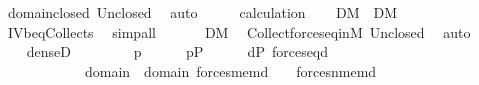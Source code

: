 \begin{isabellebody}
\ domain{\isacharunderscore}{\kern0pt}closed\ Un{\isacharunderscore}{\kern0pt}closed\ \isamarkupfalse%
\ auto\isanewline
\ \ \isamarkupfalse%
\ \isamarkupfalse%
\ calculation\isanewline
\ \ \isamarkupfalse%
\ {\isachardoublequoteopen}{\isacharquery}{\kern0pt}D{}{\isasymin}M{\isachardoublequoteclose}\ \ {\isachardoublequoteopen}{\isacharquery}{\kern0pt}D{}{\isasymin}M{\isachardoublequoteclose}\ \isamarkupfalse%
\ IV{}{}{}b{\isacharunderscore}{\kern0pt}eq{\isacharunderscore}{\kern0pt}Collects\ \isamarkupfalse%
\ simp{\isacharunderscore}{\kern0pt}all\isanewline
\ \ \isamarkupfalse%
\isanewline
\ \ \isamarkupfalse%
\ {\isachardoublequoteopen}{\isacharquery}{\kern0pt}D{\isasymin}M{\isachardoublequoteclose}\ \isamarkupfalse%
\ Collect{\isacharunderscore}{\kern0pt}forces{\isacharunderscore}{\kern0pt}eq{\isacharunderscore}{\kern0pt}in{\isacharunderscore}{\kern0pt}M\ Un{\isacharunderscore}{\kern0pt}closed\ \isamarkupfalse%
\ auto\isanewline
\ \ \isamarkupfalse%
\isanewline
\ \ \isamarkupfalse%
\ {\isachardoublequoteopen}dense{\isacharparenleft}{\kern0pt}{\isacharquery}{\kern0pt}D{\isacharparenright}{\kern0pt}{\isachardoublequoteclose}\isanewline
\ \ \isamarkupfalse%
\isanewline
\ \ \ \ \isamarkupfalse%
\ p\isanewline
\ \ \ \ \isamarkupfalse%
\ {\isachardoublequoteopen}p{\isasymin}P{\isachardoublequoteclose}\isanewline
\ \ \ \ \isamarkupfalse%
\ {\isachardoublequoteopen}{\isasymexists}d{\isasymin}P{\isachardot}{\kern0pt}\ {\isacharparenleft}{\kern0pt}forces{\isacharunderscore}{\kern0pt}eq{\isacharparenleft}{\kern0pt}d{\isacharcomma}{\kern0pt}\ {\isasymtau}{\isacharcomma}{\kern0pt}\ {\isasymtheta}{\isacharparenright}{\kern0pt}\ {\isasymor}\isanewline
\ \ \ \ \ \ \ \ \ \ \ \ {\isacharparenleft}{\kern0pt}{\isasymexists}{\isasymsigma}{\isasymin}domain{\isacharparenleft}{\kern0pt}{\isasymtau}{\isacharparenright}{\kern0pt}\ {\isasymunion}\ domain{\isacharparenleft}{\kern0pt}{\isasymtheta}{\isacharparenright}{\kern0pt}{\isachardot}{\kern0pt}\ forces{\isacharunderscore}{\kern0pt}mem{\isacharparenleft}{\kern0pt}d{\isacharcomma}{\kern0pt}\ {\isasymsigma}{\isacharcomma}{\kern0pt}\ {\isasymtau}{\isacharparenright}{\kern0pt}\ {\isasymand}\ forces{\isacharunderscore}{\kern0pt}nmem{\isacharparenleft}{\kern0pt}d{\isacharcomma}{\kern0pt}\ {\isasymsigma}{\isacharcomma}{\kern0pt}\ {\isasymtheta}{\isacharparenright}{\kern0pt}{\isacharparenright}{\kern0pt}\ {\isasymor}\isanewline

\end{isabellebody}
